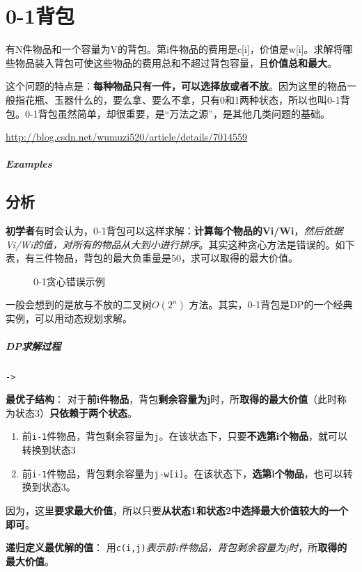 \documentclass[UTF8,a4paper,12pt]{ctexbook}
\begin{document}
	
\section{0-1背包}
	有N件物品和一个容量为V的背包。第i件物品的费用是c[i]，价值是w[i]。求解将哪些物品装入背包可使这些物品的费用总和不超过背包容量，且\textbf{价值总和最大}。
	
	这个问题的特点是：\textbf{每种物品只有一件，可以选择放或者不放}。因为这里的物品一般指花瓶、玉器什么的，要么拿、要么不拿，只有0和1两种状态，所以也叫0-1背包。0-1背包虽然简单，却很重要，是“万法之源”，是其他几类问题的基础。 

	\url{http://blog.csdn.net/wumuzi520/article/details/7014559}
	
	\subparagraph{Examples}
	
	\subsection{分析}
		\textbf{初学者}有时会认为，0-1背包可以这样求解：\textbf{计算每个物品的Vi/Wi}，\textit{然后依据Vi/Wi的值，对所有的物品从大到小进行排序}。其实这种贪心方法是错误的。如下表，有三件物品，背包的最大负重量是50，求可以取得的最大价值。
		
			\begin{figure}[h]
				\centering
				\caption{0-1贪心错误示例}
			\end{figure}
			
		一般会想到的是放与不放的二叉树$O(2^n)$ 方法。其实，0-1背包是DP的一个经典实例，可以用动态规划求解。
		
		\subparagraph{DP求解过程}\verb|->|
			
			\textbf{最优子结构}：
			对于\textbf{前i件物品}，背包\textbf{剩余容量为j}时，所\textbf{取得的最大价值}（此时称为状态3）\textbf{只依赖于两个状态}。	
			\begin{enumerate}[itemindent = 2em]
				\item 前\verb|i-1|件物品，背包剩余容量为\verb|j|。在该状态下，只要\textbf{不选第i个物品}，就可以转换到状态3
				\item 前\verb|i-1|件物品，背包剩余容量为\verb|j-w[i]|。在该状态下，\textbf{选第i个物品}，也可以转换到状态3。
			\end{enumerate}
			
			因为，这里\textbf{要求最大价值}，所以只要\textbf{从状态1和状态2中选择最大价值较大的一个即可}。
		
			\textbf{递归定义最优解的值}：
			用\verb|c(i,j)|\textit{表示前i件物品，背包剩余容量为j时}，所\textbf{取得的最大价值}。
			
\end{document}

